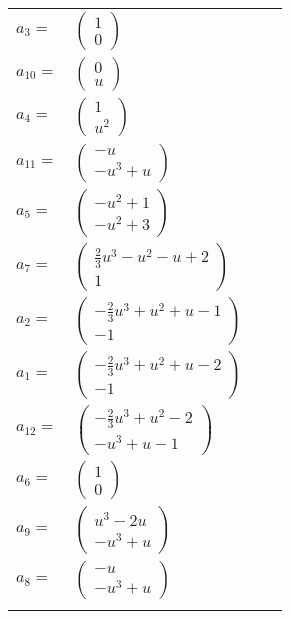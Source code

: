 \documentclass[1p]{elsarticle_modified}
\theoremstyle{definition}
\begin{document}
\begin{tabular}{m{7pt} m{180pt} m{7pt} m{180pt} }
\flushright $a_{3}=$&$\begin{pmatrix}1\\0\end{pmatrix}$ \\
\flushright $a_{10}=$&$\begin{pmatrix}0\\u\end{pmatrix}$ \\
\flushright $a_{4}=$&$\begin{pmatrix}1\\u^2\end{pmatrix}$ \\
\flushright $a_{11}=$&$\begin{pmatrix}- u\\- u^3+u\end{pmatrix}$ \\
\flushright $a_{5}=$&$\begin{pmatrix}- u^2+1\\- u^2+3\end{pmatrix}$ \\
\flushright $a_{7}=$&$\begin{pmatrix}\frac{2}{3} u^3- u^2- u+2\\1\end{pmatrix}$ \\
\flushright $a_{2}=$&$\begin{pmatrix}-\frac{2}{3} u^3+u^2+u-1\\-1\end{pmatrix}$ \\
\flushright $a_{1}=$&$\begin{pmatrix}-\frac{2}{3} u^3+u^2+u-2\\-1\end{pmatrix}$ \\
\flushright $a_{12}=$&$\begin{pmatrix}-\frac{2}{3} u^3+u^2-2\\- u^3+u-1\end{pmatrix}$ \\
\flushright $a_{6}=$&$\begin{pmatrix}1\\0\end{pmatrix}$ \\
\flushright $a_{9}=$&$\begin{pmatrix}u^3-2 u\\- u^3+u\end{pmatrix}$ \\
\flushright $a_{8}=$&$\begin{pmatrix}- u\\- u^3+u\end{pmatrix}$\\&\end{tabular}
\end{document}
